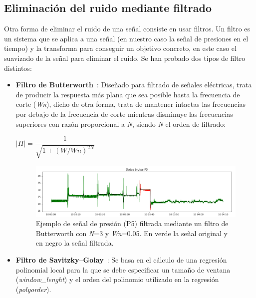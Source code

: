 \subsection{Eliminación del ruido mediante filtrado}

Otra forma de eliminar el ruido de una señal consiste en usar filtros. Un filtro es un sistema que se aplica a una señal (en nuestro caso la señal de presiones en el tiempo) y la transforma para conseguir un objetivo concreto, en este caso el suavizado de la señal para eliminar el ruido. Se han probado dos tipos de filtro distintos: 

\begin{itemize}
	\item \textbf{Filtro de Butterworth}~\cite{wiki:butterworth,scipybutter}: Diseñado para filtrado de señales eléctricas, trata de producir la respuesta más plana que sea posible hasta la frecuencia de corte (\textit{Wn}), dicho de otra forma, trata de mantener intactas las frecuencias por debajo de la frecuencia de corte mientras disminuye las frecuencias superiores con razón proporcional a \textit{N}, siendo \textit{N} el orden de filtrado:
	\begin{center}
		$|H| = \dfrac{1}{\sqrt{1+(W/Wn)^{2N}}}$
	\end{center}

	\begin{figure}[H]
		\centering
		\includegraphics[width=1\textwidth]{../img/senalP5butter.png}
		\caption[Señal de presión (P5) filtrada con Butterworth.] {Ejemplo de señal de presión (P5) filtrada mediante un filtro de Butterworth con \textit{N}=3 y \textit{Wn}=0.05. En verde la señal original y en negro la señal filtrada.}
		\label{fig:senalP5butter}
	\end{figure}
	
	\item \textbf{Filtro de Savitzky–Golay}~\cite{wiki:savitzkygolay,scipysavgol}: Se basa en el cálculo de una regresión polinomial local para la que se debe especificar un tamaño de ventana (\textit{window\_lenght}) y el orden del polinomio utilizado en la regresión (\textit{polyorder}). 
	

\end{itemize}

